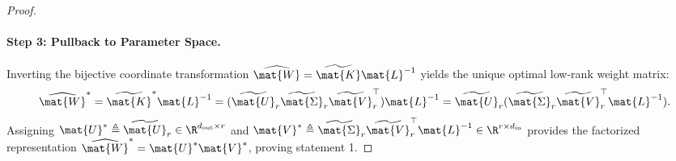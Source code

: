 \begin{proof}
\paragraph{Step 3: Pullback to Parameter Space.}
Inverting the bijective coordinate transformation $\widehat{\mat{W}} = \widetilde{\mat{K}} \mat{L}^{-1}$ yields the unique optimal low-rank weight matrix:
\begin{equation}
\widehat{\mat{W}}^* = \widetilde{\mat{K}}^* \mat{L}^{-1} = (\widetilde{\mat{U}}_r \widetilde{\mat{\Sigma}}_r \widetilde{\mat{V}}_r^\top) \mat{L}^{-1} = \widetilde{\mat{U}}_r (\widetilde{\mat{\Sigma}}_r \widetilde{\mat{V}}_r^\top \mat{L}^{-1}).
\end{equation}
Assigning $\mat{U}^* \triangleq \widetilde{\mat{U}}_r \in \R^{d_{\text{out}} \times r}$ and $\mat{V}^* \triangleq \widetilde{\mat{\Sigma}}_r \widetilde{\mat{V}}_r^\top \mat{L}^{-1} \in \R^{r \times d_{\text{in}}}$ provides the factorized representation $\widehat{\mat{W}}^* = \mat{U}^* \mat{V}^*$, proving statement 1.


\end{proof}
